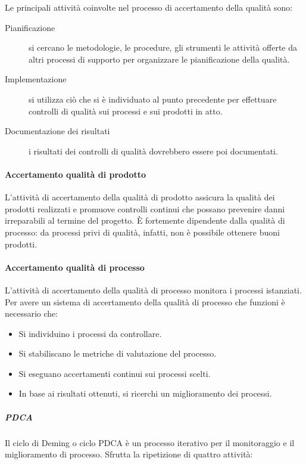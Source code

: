 \documentclass[../norme-di-progetto.tex]{subfiles}
\begin{document}
Le principali attività coinvolte nel processo di accertamento della qualità sono:

\begin{description}
  \item [Pianificazione] si cercano le metodologie, le procedure, gli strumenti le attività offerte da altri processi di supporto per organizzare le pianificazione della qualità.
  \item [Implementazione] si utilizza ciò che si è individuato al punto precedente per effettuare controlli di qualità sui processi e sui prodotti in atto.
  \item [Documentazione dei risultati] i risultati dei controlli di qualità dovrebbero essere poi documentati.
\end{description}

\paragraph{Accertamento qualità di prodotto}%
\label{par:accertamento_qualita_di_prodotto}
L'attività di accertamento della qualità di prodotto assicura la qualità dei prodotti realizzati e promuove controlli continui che possano prevenire danni irreparabili al termine del progetto. È fortemente dipendente dalla qualità di processo: da processi privi di qualità, infatti, non è possibile ottenere buoni prodotti.

\paragraph{Accertamento qualità di processo}%
\label{par:accertamento_qualita_di_processo}
L'attività di accertamento della qualità di processo monitora i processi istanziati. Per avere un sistema di accertamento della qualità di processo che funzioni è necessario che:

\begin{itemize}
  \item Si individuino i processi da controllare.
  \item Si stabiliscano le metriche di valutazione del processo.
  \item Si eseguano accertamenti continui sui processi scelti.
  \item In base ai risultati ottenuti, si ricerchi un miglioramento dei processi.
\end{itemize}

\subparagraph{PDCA}%
\label{subp:PDCA}
Il ciclo di Deming o ciclo PDCA è un processo iterativo per il monitoraggio e il miglioramento di processo. Sfrutta la ripetizione di quattro attività:
\end{document}
